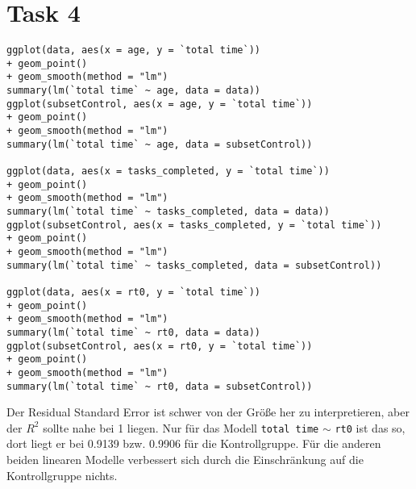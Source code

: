 \documentclass{article}
\begin{document}
	\section*{Task 4}
	\begin{lstlisting}
ggplot(data, aes(x = age, y = `total time`)) 
+ geom_point() 
+ geom_smooth(method = "lm")
summary(lm(`total time` ~ age, data = data))
ggplot(subsetControl, aes(x = age, y = `total time`)) 
+ geom_point() 
+ geom_smooth(method = "lm")
summary(lm(`total time` ~ age, data = subsetControl))

ggplot(data, aes(x = tasks_completed, y = `total time`)) 
+ geom_point() 
+ geom_smooth(method = "lm")
summary(lm(`total time` ~ tasks_completed, data = data))
ggplot(subsetControl, aes(x = tasks_completed, y = `total time`)) 
+ geom_point() 
+ geom_smooth(method = "lm")
summary(lm(`total time` ~ tasks_completed, data = subsetControl))

ggplot(data, aes(x = rt0, y = `total time`)) 
+ geom_point() 
+ geom_smooth(method = "lm")
summary(lm(`total time` ~ rt0, data = data))
ggplot(subsetControl, aes(x = rt0, y = `total time`)) 
+ geom_point() 
+ geom_smooth(method = "lm")
summary(lm(`total time` ~ rt0, data = subsetControl))
	\end{lstlisting}
	Der Residual Standard Error ist schwer von der Größe her zu interpretieren, aber der $R^2$ sollte nahe bei 1 liegen. Nur für das Modell \texttt{total time} $\sim$ \texttt{rt0} ist das so, dort liegt er bei 0.9139 bzw. 0.9906 für die Kontrollgruppe. Für die anderen beiden linearen Modelle verbessert sich durch die Einschränkung auf die Kontrollgruppe nichts.
	
\end{document}

